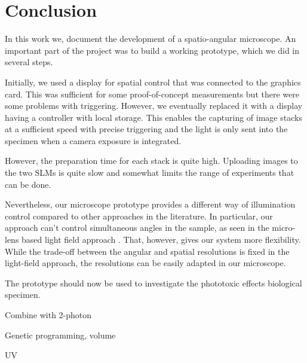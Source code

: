 \chapter{Conclusion}
In this work we, document the development of a spatio-angular
microscope. An important part of the project was to build a working
prototype, which we did in several steps.

Initially, we used a display for spatial control that was connected to
the graphics card. This was sufficient for some proof-of-concept
measurements but there were some problems with triggering. However, we
eventually replaced it with a display having a controller with local
storage. This enables the capturing of image stacks at a sufficient
speed with precise triggering and the light is only sent into the
specimen when a camera exposure is integrated.

However, the preparation time for each stack is quite high.  Uploading
images to the two SLMs is quite slow and somewhat limits the range of
experiments that can be done.

Nevertheless, our microscope prototype provides a different way of
illumination control compared to other approaches in the
literature. In particular, our approach can't control simultaneous
angles in the sample, as seen in the micro-lens based light field
approach \citep{Levoy2009}. That, however, gives our system more
flexibility. While the trade-off between the angular and spatial
resolutions is fixed in the light-field approach, the resolutions can
be easily adapted in our microscope.

The prototype should now be used to investigate the phototoxic effects
biological specimen.





Combine with 2-photon

Genetic programming, volume

UV